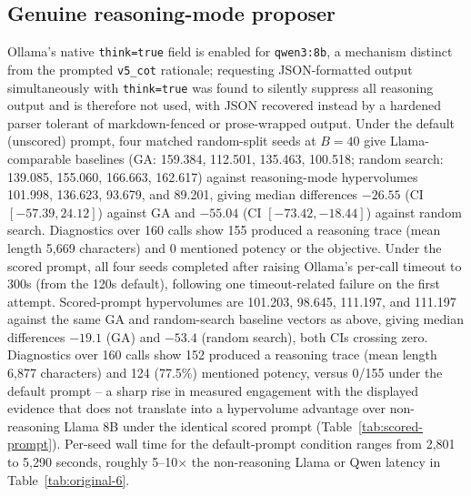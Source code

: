 \subsection{Genuine reasoning-mode proposer}
\label{app:reasoning}
Ollama's native \texttt{think=true} field is enabled for \texttt{qwen3:8b}, a mechanism distinct from the prompted \texttt{v5\_cot} rationale; requesting JSON-formatted output simultaneously with \texttt{think=true} was found to silently suppress all reasoning output and is therefore not used, with JSON recovered instead by a hardened parser tolerant of markdown-fenced or prose-wrapped output. Under the default (unscored) prompt, four matched random-split seeds at $B=40$ give Llama-comparable baselines (GA: 159.384, 112.501, 135.463, 100.518; random search: 139.085, 155.060, 166.663, 162.617) against reasoning-mode hypervolumes 101.998, 136.623, 93.679, and 89.201, giving median differences $-26.55$ (CI $[-57.39,24.12]$) against GA and $-55.04$ (CI $[-73.42,-18.44]$) against random search. Diagnostics over 160 calls show 155 produced a reasoning trace (mean length 5,669 characters) and 0 mentioned potency or the objective. Under the scored prompt, all four seeds completed after raising Ollama's per-call timeout to 300s (from the 120s default), following one timeout-related failure on the first attempt. Scored-prompt hypervolumes are 101.203, 98.645, 111.197, and 111.197 against the same GA and random-search baseline vectors as above, giving median differences $-19.1$ (GA) and $-53.4$ (random search), both CIs crossing zero. Diagnostics over 160 calls show 152 produced a reasoning trace (mean length 6,877 characters) and 124 (77.5\%) mentioned potency, versus 0/155 under the default prompt -- a sharp rise in measured engagement with the displayed evidence that does not translate into a hypervolume advantage over non-reasoning Llama 8B under the identical scored prompt (Table~\ref{tab:scored-prompt}). Per-seed wall time for the default-prompt condition ranges from 2,801 to 5,290 seconds, roughly 5--10$\times$ the non-reasoning Llama or Qwen latency in Table~\ref{tab:original-6}.

